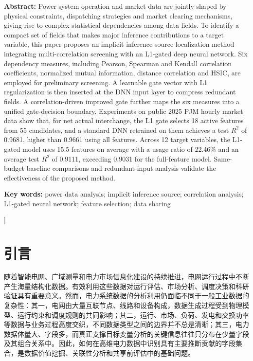 \documentclass[UTF8,zihao=5,twoside]{ctexart}
\numberwithin{equation}{section}
\newcommand{\fundcn}{基金项目：无。}
\newcommand{\funden}{Foundation item: None.}
\begin{document}
\noindent\textbf{Abstract:} Power system operation and market data are jointly shaped by physical constraints, dispatching strategies and market clearing mechanisms, giving rise to complex statistical dependencies among data fields. To identify a compact set of fields that makes major inference contributions to a target variable, this paper proposes an implicit inference-source localization method integrating multi-correlation screening with an L1-gated deep neural network. Six dependency measures, including Pearson, Spearman and Kendall correlation coefficients, normalized mutual information, distance correlation and HSIC, are employed for preliminary screening. A learnable gate vector with L1 regularization is then inserted at the DNN input layer to compress redundant fields. A correlation-driven improved gate further maps the six measures into a unified gate-decision boundary. Experiments on public 2025 PJM hourly market data show that, for net actual interchange, the L1 gate selects 18 active features from 55 candidates, and a standard DNN retrained on them achieves a test $R^2$ of 0.9681, higher than 0.9661 using all features. Across 12 target variables, the L1-gated model uses 15.5 features on average with a usage ratio of 22.46\% and an average test $R^2$ of 0.9111, exceeding 0.9031 for the full-feature model. Same-budget baseline comparisons and redundant-input analysis validate the effectiveness of the proposed method.\par
\noindent\textbf{Key words:} power data analysis; implicit inference source; correlation analysis; L1-gated neural network; feature selection; data sharing\par\vspace{0.8em}

\noindent{\small\fundcn\\\funden}
\vspace{0.8em}
]

\section{引言}
随着智能电网、广域测量和电力市场信息化建设的持续推进，电网运行过程中不断产生海量结构化数据。有效利用这些数据对运行评估、市场分析、调度决策和科研验证具有重要意义\cite{ref-liu-cps,ref-ma-pjm,ref-fan-pjm}。然而，电力系统数据的分析利用仍面临不同于一般工业数据的复杂性：其一，电网由大量互联节点、线路和设备构成，数据生成过程受到物理模型、运行约束和调度规则的共同影响；其二，运行、市场、负荷、发电和交换功率等数据与业务过程高度交织，不同数据类型之间的边界并不总是清晰；其三，电力数据体量大、字段多，而真正支撑目标变量分析的关键信息往往只分布在少量字段及其组合关系中。因此，如何在高维电力数据中识别具有主要推断贡献的字段集合，是数据价值挖掘、关联性分析和共享前评估中的基础问题。
\end{document}
